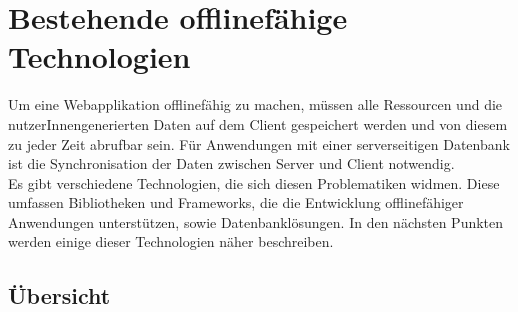 %
%
\chapter{\label{chap:state}Bestehende offlinefähige Technologien}
Um eine Webapplikation offlinefähig zu machen, müssen alle Ressourcen und die nutzerInnengenerierten Daten auf dem Client gespeichert werden und von diesem zu jeder Zeit abrufbar sein.
Für Anwendungen mit einer serverseitigen Datenbank ist die Synchronisation der Daten zwischen Server und Client notwendig.\\
Es gibt verschiedene Technologien, die sich diesen Problematiken widmen.
Diese umfassen Bibliotheken und Frameworks, die die Entwicklung offlinefähiger Anwendungen unterstützen, sowie Datenbanklösungen. In den nächsten Punkten werden einige dieser Technologien näher beschreiben.
%
%

%
%

%
%

%
%

%
%

%
\clearpage
\section{Übersicht}
